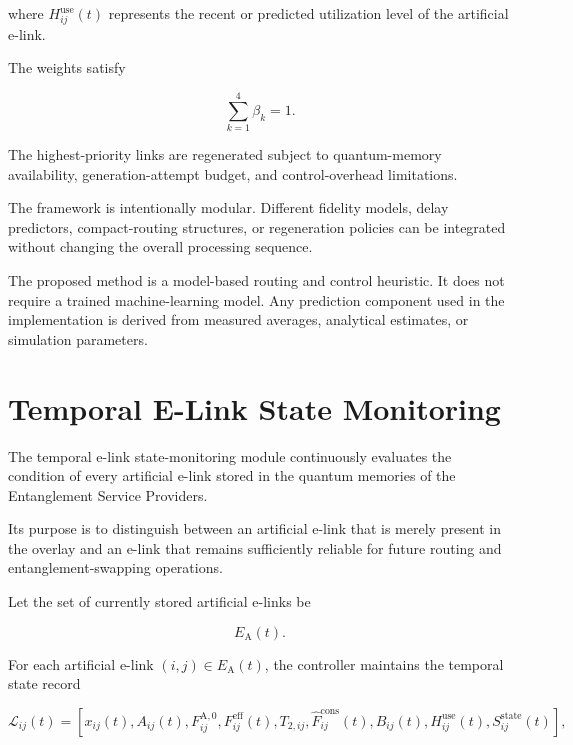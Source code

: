 where $H_{ij}^{\mathrm{use}}(t)$ represents the recent or predicted utilization level of the artificial e-link.

The weights satisfy

\begin{equation}
    \sum_{k=1}^{4}
    \beta_k
    =
    1.
\end{equation}

The highest-priority links are regenerated subject to quantum-memory availability, generation-attempt budget, and control-overhead limitations.

The framework is intentionally modular. Different fidelity models, delay predictors, compact-routing structures, or regeneration policies can be integrated without changing the overall processing sequence.

The proposed method is a model-based routing and control heuristic. It does not require a trained machine-learning model. Any prediction component used in the implementation is derived from measured averages, analytical estimates, or simulation parameters.
\section{Temporal E-Link State Monitoring}

The temporal e-link state-monitoring module continuously evaluates the condition of every artificial e-link stored in the quantum memories of the Entanglement Service Providers.

Its purpose is to distinguish between an artificial e-link that is merely present in the overlay and an e-link that remains sufficiently reliable for future routing and entanglement-swapping operations.

Let the set of currently stored artificial e-links be

\begin{equation}
    E_{\mathrm{A}}(t).
\end{equation}

For each artificial e-link $(i,j)\in E_{\mathrm{A}}(t)$, the controller maintains the temporal state record

\begin{equation}
    \mathcal{L}_{ij}(t)
    =
    \left[
    x_{ij}(t),
    A_{ij}(t),
    F_{ij}^{\mathrm{A},0},
    F_{ij}^{\mathrm{eff}}(t),
    T_{2,ij},
    \widehat{F}_{ij}^{\mathrm{cons}}(t),
    B_{ij}(t),
    H_{ij}^{\mathrm{use}}(t),
    S_{ij}^{\mathrm{state}}(t)
    \right],
\end{equation}

